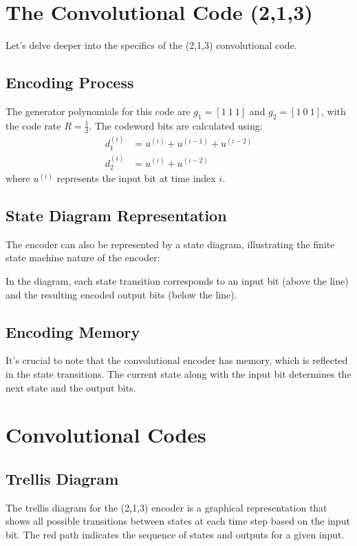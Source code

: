 \section*{The Convolutional Code (2,1,3)}

Let's delve deeper into the specifics of the (2,1,3) convolutional code.

\subsection*{Encoding Process}
The generator polynomials for this code are $g_1 = [1\ 1\ 1]$ and $g_2 = [1\ 0\ 1]$, with the code rate $R = \frac{1}{2}$. The codeword bits are calculated using:
\begin{align*}
    d_1^{(i)} &= u^{(i)} + u^{(i-1)} + u^{(i-2)} \\
    d_2^{(i)} &= u^{(i)} + u^{(i-2)}
\end{align*}
where $u^{(i)}$ represents the input bit at time index $i$.

\subsection*{State Diagram Representation}
The encoder can also be represented by a state diagram, illustrating the finite state machine nature of the encoder:

In the diagram, each state transition corresponds to an input bit (above the line) and the resulting encoded output bits (below the line).

\subsection*{Encoding Memory}
It's crucial to note that the convolutional encoder has memory, which is reflected in the state transitions. The current state along with the input bit determines the next state and the output bits.








\section*{Convolutional Codes}

\subsection*{Trellis Diagram}
The trellis diagram for the (2,1,3) encoder is a graphical representation that shows all possible transitions between states at each time step based on the input bit. The red path indicates the sequence of states and outputs for a given input.
